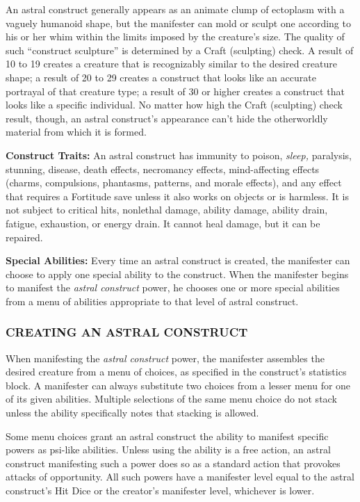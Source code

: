 \documentclass{article}
\begin{document}
An astral construct generally appears as an animate clump of ectoplasm with a vaguely 
humanoid shape, but the manifester can mold or sculpt one according to his or her 
whim within the limits imposed by the creature's size. The quality of such ``construct 
sculpture'' is determined by a Craft (sculpting) check. A result of 10 to 19 creates 
a creature that is recognizably similar to the desired creature shape; a result 
of 20 to 29 creates a construct that looks like an accurate portrayal of that creature 
type; a result of 30 or higher creates a construct that looks like a specific individual. 
No matter how high the Craft (sculpting) check result, though, an astral construct's 
appearance can't hide the otherworldly material from which it is formed.

\textbf{Construct Traits:} An astral construct has immunity to poison, \textit{sleep, 
}paralysis, stunning, disease, death effects, necromancy effects, mind-affecting 
effects (charms, compulsions, phantasms, patterns, and morale effects), and any 
effect that requires a Fortitude save unless it also works on objects or is harmless. 
It is not subject to critical hits, nonlethal damage, ability damage, ability drain, 
fatigue, exhaustion, or energy drain. It cannot heal damage, but it can be repaired.

\textbf{Special Abilities:} Every time an astral construct is created, the manifester 
can choose to apply one special ability to the construct. When the manifester begins 
to manifest the \textit{astral construct }power, he chooses one or more special 
abilities from a menu of abilities appropriate to that level of astral construct.

\subsubsection*{CREATING AN ASTRAL CONSTRUCT}

When manifesting the \textit{astral construct }power, the manifester assembles 
the desired creature from a menu of choices, as specified in the construct's statistics 
block. A manifester can always substitute two choices from a lesser menu for one 
of its given abilities. Multiple selections of the same menu choice do not stack 
unless the ability specifically notes that stacking is allowed.

Some menu choices grant an astral construct the ability to manifest specific powers 
as psi-like abilities. Unless using the ability is a free action, an astral construct 
manifesting such a power does so as a standard action that provokes attacks of 
opportunity. All such powers have a manifester level equal to the astral construct's 
Hit Dice or the creator's manifester level, whichever is lower.
\end{document}
